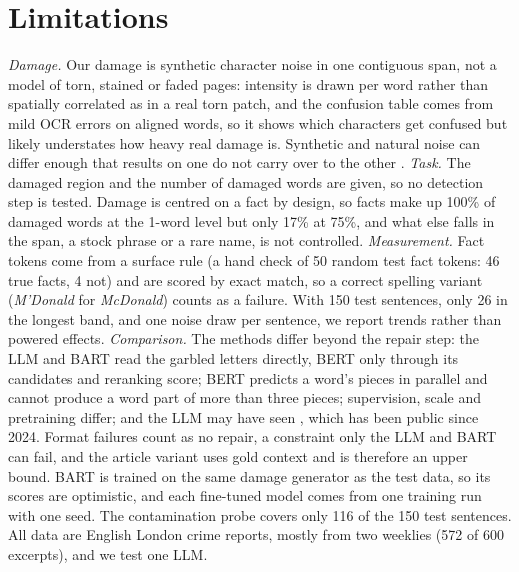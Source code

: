 \section*{Limitations}

\emph{Damage.} Our damage is synthetic character noise in one contiguous span, not a model of torn, stained or
faded pages: intensity is drawn per word rather than spatially correlated as in a real torn patch, and the
confusion table comes from mild OCR errors on aligned words, so it shows which characters get confused but likely
understates how heavy real damage is. Synthetic and natural noise can differ enough that results on one do not carry
over to the other \citep{belinkov2018synthetic}.
\emph{Task.} The damaged region and the number of damaged words are given, so no detection step is tested. Damage is
centred on a fact by design, so facts make up 100\% of damaged words at the 1-word level but only 17\% at 75\%, and
what else falls in the span, a stock phrase or a rare name, is not controlled. \emph{Measurement.} Fact tokens come
from a surface rule (a hand check of 50 random test fact tokens:
46 true facts, 4 not) and are scored by exact match, so a correct spelling variant (\emph{M'Donald} for
\emph{McDonald}) counts as a failure. With 150 test sentences, only 26 in the longest band, and one noise draw per
sentence, we report trends rather than powered effects. \emph{Comparison.} The methods differ beyond the repair
step: the LLM and BART read the garbled letters directly, BERT only through its candidates and reranking score; BERT predicts a word's
pieces in parallel \citep{shen2020blank} and cannot produce a word part of more than three pieces; supervision, scale and
pretraining differ; and the LLM may have seen \bln{}, which has been public since 2024. Format failures count as no
repair, a constraint only the LLM and BART can fail, and the article variant uses gold context and is therefore an upper bound. BART is trained on the same damage
generator as the test data, so its scores are optimistic, and each fine-tuned model comes from one training run
with one seed. The contamination
probe covers only 116 of the 150 test sentences. All data are English
London crime reports, mostly from two weeklies (572 of 600 excerpts), and we test one LLM.